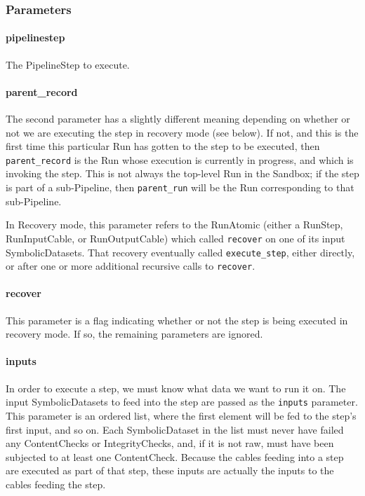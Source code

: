 \documentclass[12pt]{article}
\newcommand{\code}[1]{\texttt{#1}}
\begin{document}
\subsubsection*{Parameters}

\paragraph*{pipelinestep}

The PipelineStep to execute.

\paragraph*{parent\_record}

The second parameter has a slightly different meaning depending on whether or
not we are executing the step in recovery mode (see below). If not, and this is
the first time this particular Run has gotten to the step to be executed, then
\code{parent\_record} is the Run whose execution is currently in progress, and
which is invoking the step. This is not always the top-level Run in the
Sandbox; if the step is part of a sub-Pipeline, then \code{parent\_run} will be
the Run corresponding to that sub-Pipeline.

In Recovery mode, this parameter refers to the RunAtomic (either a RunStep,
RunInputCable, or RunOutputCable) which called \code{recover} on one of its
input SymbolicDatasets. That recovery eventually called \code{execute\_step},
either directly, or after one or more additional recursive calls to
\code{recover}. 

\paragraph*{recover}

This parameter is a flag indicating whether or not the step is being executed
in recovery mode. If so, the remaining parameters are ignored.

\paragraph*{inputs}

In order to execute a step, we must know what data we want to run it on. The
input SymbolicDatasets to feed into the step are passed as the \code{inputs}
parameter. This parameter is an ordered list, where the first element will be
fed to the step's first input, and so on. Each SymbolicDataset in the list must
never have failed any ContentChecks or IntegrityChecks, and, if it is not raw,
must have been subjected to at least one ContentCheck. Because the cables
feeding into a step are executed as part of that step, these inputs are
actually the inputs to the cables feeding the step. 
\end{document}
